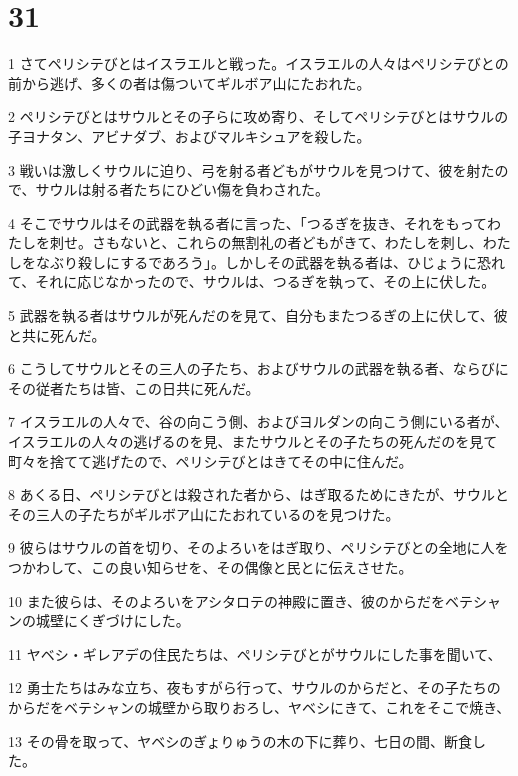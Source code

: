 \chapter{31}

\par 1 さてペリシテびとはイスラエルと戦った。イスラエルの人々はペリシテびとの前から逃げ、多くの者は傷ついてギルボア山にたおれた。
\par 2 ペリシテびとはサウルとその子らに攻め寄り、そしてペリシテびとはサウルの子ヨナタン、アビナダブ、およびマルキシュアを殺した。
\par 3 戦いは激しくサウルに迫り、弓を射る者どもがサウルを見つけて、彼を射たので、サウルは射る者たちにひどい傷を負わされた。
\par 4 そこでサウルはその武器を執る者に言った、「つるぎを抜き、それをもってわたしを刺せ。さもないと、これらの無割礼の者どもがきて、わたしを刺し、わたしをなぶり殺しにするであろう」。しかしその武器を執る者は、ひじょうに恐れて、それに応じなかったので、サウルは、つるぎを執って、その上に伏した。
\par 5 武器を執る者はサウルが死んだのを見て、自分もまたつるぎの上に伏して、彼と共に死んだ。
\par 6 こうしてサウルとその三人の子たち、およびサウルの武器を執る者、ならびにその従者たちは皆、この日共に死んだ。
\par 7 イスラエルの人々で、谷の向こう側、およびヨルダンの向こう側にいる者が、イスラエルの人々の逃げるのを見、またサウルとその子たちの死んだのを見て町々を捨てて逃げたので、ペリシテびとはきてその中に住んだ。
\par 8 あくる日、ペリシテびとは殺された者から、はぎ取るためにきたが、サウルとその三人の子たちがギルボア山にたおれているのを見つけた。
\par 9 彼らはサウルの首を切り、そのよろいをはぎ取り、ペリシテびとの全地に人をつかわして、この良い知らせを、その偶像と民とに伝えさせた。
\par 10 また彼らは、そのよろいをアシタロテの神殿に置き、彼のからだをベテシャンの城壁にくぎづけにした。
\par 11 ヤベシ・ギレアデの住民たちは、ペリシテびとがサウルにした事を聞いて、
\par 12 勇士たちはみな立ち、夜もすがら行って、サウルのからだと、その子たちのからだをベテシャンの城壁から取りおろし、ヤベシにきて、これをそこで焼き、
\par 13 その骨を取って、ヤベシのぎょりゅうの木の下に葬り、七日の間、断食した。


